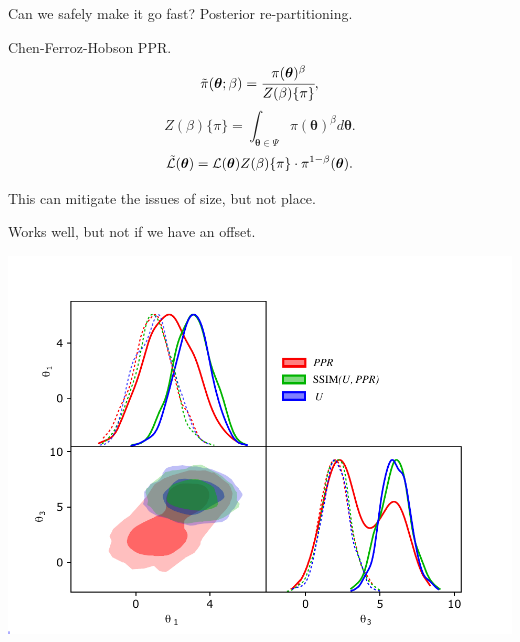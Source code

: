 \documentclass[bigger]{beamer}
\begin{document}
\begin{frame}[label={sec:org958d1e9}]{Can we safely make it go fast? Posterior re-partitioning.}

\begin{block}{Chen-Ferroz-Hobson PPR.}
\begin{equation*}
\tilde{\pi}(\bm{\bm{\theta}};\beta) = \cfrac{\pi(\bm{\theta})^{\beta}}{Z(\beta)\{\pi\}},
\end{equation*}
\begin{equation*}
 Z(\beta)\{\pi\} = \int_{\bm{\theta} \in \Psi}		\pi(\bm{\bm{\theta}})^{\beta}d\bm{\bm{\theta}}.
 \end{equation*}
\begin{equation*}
\tilde{\cal L}(\bm{\theta}) = {\cal L}(\bm{\theta}) Z(\beta)\{\pi\} \cdot		\pi^{1-\beta}(\bm{\theta}).
\end{equation*}
\end{block}
This can mitigate the issues of size, but not place.

\end{frame}



\begin{frame}[label={sec:org73e18f6}]{Works well, but not if we have an offset.}
\begin{center}
\includegraphics[width=.9\linewidth]{./illustrations/convergence.pdf}
\end{center}
\end{frame}
\end{document}
